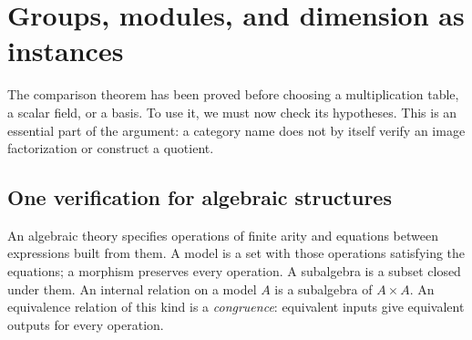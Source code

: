 \section{Groups, modules, and dimension as instances}\label{e:section}

The comparison theorem has been proved before choosing a multiplication
table, a scalar field, or a basis. To use it, we must now check its hypotheses.
This is an essential part of the argument: a category name does not by itself
verify an image factorization or construct a quotient.

\subsection{One verification for algebraic structures}\label{e:varieties}

An algebraic theory specifies operations of finite arity and equations between
expressions built from them. A model is a set with those operations satisfying
the equations; a morphism preserves every operation. A subalgebra is a subset
closed under them. An internal relation on a model $A$ is a subalgebra of
$A\times A$. An equivalence relation of this kind is a \emph{congruence}:
equivalent inputs give equivalent outputs for every operation.

